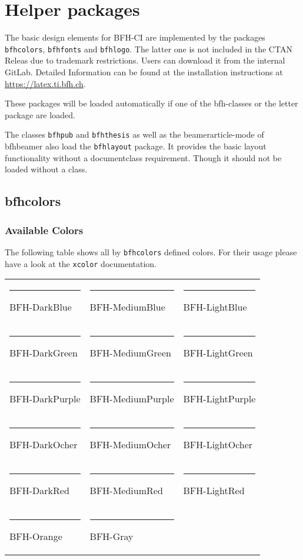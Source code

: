 \documentclass[
]{bfhpub}				%
\newcommand*{\pkg}[1]{\texttt{#1}}
\newcommand*{\cls}[1]{\texttt{#1}}
\newcommand\BFHcolorBox[1]{\textcolor{#1}{\rule{2em}{1em}}\hspace{0.5em}#1}
\begin{document}
\section{Helper packages}


The basic design elements for BFH-CI are implemented by the packages \pkg{bfhcolors}, \pkg{bfhfonts} and \pkg{bfhlogo}.
The latter one is not included in the CTAN Releas due to trademark restrictions.
Users can download it from the internal GitLab.
Detailed Information can be found at the installation instructions at  \url{https://latex.ti.bfh.ch}.

These packages will be loaded automatically if one of the bfh-classes or the letter package are loaded.

The classes \cls{bfhpub} and \cls{bfhthesis} as well as the beamerarticle-mode of bfhbeamer also load the \pkg{bfhlayout} package.
It provides the basic layout functionality without a documentclass requirement.
Though it should not be loaded without a \KOMAScript{} class.


\subsection{bfhcolors}

\subsubsection{Available Colors}

The following table shows all by \pkg{bfhcolors} defined colors. For their usage please have a look at the \pkg{xcolor} documentation.

\medskip
\begin{tabular}{@{}lll}
	\BFHcolorBox{BFH-DarkBlue}   & \BFHcolorBox{BFH-MediumBlue}   & \BFHcolorBox{BFH-LightBlue}   \\
	\BFHcolorBox{BFH-DarkGreen}  & \BFHcolorBox{BFH-MediumGreen}  & \BFHcolorBox{BFH-LightGreen}  \\
	\BFHcolorBox{BFH-DarkPurple} & \BFHcolorBox{BFH-MediumPurple} & \BFHcolorBox{BFH-LightPurple} \\
	\BFHcolorBox{BFH-DarkOcher}  & \BFHcolorBox{BFH-MediumOcher}  & \BFHcolorBox{BFH-LightOcher}  \\
	\BFHcolorBox{BFH-DarkRed}    & \BFHcolorBox{BFH-MediumRed}    & \BFHcolorBox{BFH-LightRed}    \\[1em]
	\BFHcolorBox{BFH-Orange} &\BFHcolorBox{BFH-Gray}
\end{tabular}
\end{document}
